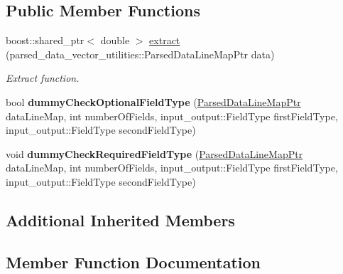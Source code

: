 \subsection*{Public Member Functions}
\begin{DoxyCompactItemize}
\item 
boost\+::shared\+\_\+ptr$<$ double $>$ \hyperlink{classtudat_1_1input__output_1_1DummyExtractor_acfca71eebd8c789469ce7b74890392fb}{extract} (parsed\+\_\+data\+\_\+vector\+\_\+utilities\+::\+Parsed\+Data\+Line\+Map\+Ptr data)
\begin{DoxyCompactList}\small\item\em Extract function. \end{DoxyCompactList}\item 
bool {\bfseries dummy\+Check\+Optional\+Field\+Type} (\hyperlink{classtudat_1_1input__output_1_1Extractor_abfff04b61512a08b822cbcecb6613253}{Parsed\+Data\+Line\+Map\+Ptr} data\+Line\+Map, int number\+Of\+Fields, input\+\_\+output\+::\+Field\+Type first\+Field\+Type, input\+\_\+output\+::\+Field\+Type second\+Field\+Type)\hypertarget{classtudat_1_1input__output_1_1DummyExtractor_aed6ce9fd84ec9559dcd051017f0f8365}{}\label{classtudat_1_1input__output_1_1DummyExtractor_aed6ce9fd84ec9559dcd051017f0f8365}

\item 
void {\bfseries dummy\+Check\+Required\+Field\+Type} (\hyperlink{classtudat_1_1input__output_1_1Extractor_abfff04b61512a08b822cbcecb6613253}{Parsed\+Data\+Line\+Map\+Ptr} data\+Line\+Map, int number\+Of\+Fields, input\+\_\+output\+::\+Field\+Type first\+Field\+Type, input\+\_\+output\+::\+Field\+Type second\+Field\+Type)\hypertarget{classtudat_1_1input__output_1_1DummyExtractor_a54b5e685dc70a133b226648caa3cdd39}{}\label{classtudat_1_1input__output_1_1DummyExtractor_a54b5e685dc70a133b226648caa3cdd39}

\end{DoxyCompactItemize}
\subsection*{Additional Inherited Members}


\subsection{Member Function Documentation}
